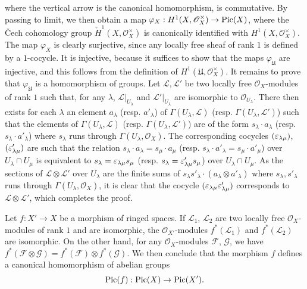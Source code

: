 where the vertical arrow is the canonical homomorphism, is commutative. By passing to limit, we then obtain a map $\varphi_X:H^1(X,\mathscr{O}_X^{\times})\to\mathrm{Pic}(X)$, where the \v{C}ech cohomology group $\check{H}^1(X,\mathscr{O}_{X}^{\times})$ is canonically identified with $H^1(X,\mathscr{O}_X^{\times})$. The map $\varphi_X$ is clearly surjective, since any locally free sheaf of rank $1$ is defined by a $1$-cocycle. It is injective, because it suffices to show that the maps $\varphi_{\mathfrak{U}}$ are injective, and this follows from the definition of $H^1(\mathfrak{U},\mathscr{O}_X^{\times})$. It remains to prove that $\varphi_{\mathfrak{U}}$ is a homomorphism of groups. Let $\mathscr{L},\mathscr{L}'$ be two locally free $\mathscr{O}_X$-modules of rank $1$ such that, for any $\lambda$, $\mathscr{L}|_{U_\lambda}$ and $\mathscr{L}'|_{U_\lambda}$ are isomorphic to $\mathscr{O}_{U_\lambda}$. There then exists for each $\lambda$ an element $a_\lambda$ (resp. $a'_\lambda$) of $\Gamma(U_\lambda,\mathscr{L})$ (resp. $\Gamma(U_\lambda,\mathscr{L}')$) such that the elements of $\Gamma(U_\lambda,\mathscr{L})$ (resp. $\Gamma(U_\lambda,\mathscr{L}')$) are of the form $s_\lambda\cdot a_\lambda$ (resp. $s_\lambda\cdot a'_\lambda$) where $s_\lambda$ runs through $\Gamma(U_\lambda,\mathscr{O}_X)$. The corresponding cocycles $(\varepsilon_{\lambda\mu})$, $(\varepsilon_{\lambda\mu}')$ are such that the relation $s_\lambda\cdot a_\lambda=s_\mu\cdot a_\mu$ (resp. $s_\lambda\cdot a'_\lambda=s_\mu\cdot a'_\mu$) over $U_\lambda\cap U_\mu$ is equivalent to $s_\lambda=\varepsilon_{\lambda\mu}s_\mu$ (resp. $s_\lambda=\varepsilon'_{\lambda\mu}s_\mu$) over $U_\lambda\cap U_\mu$. As the sections of $\mathscr{L}\otimes\mathscr{L}'$ over $U_\lambda$ are the finite sums of $s_\lambda s'_\lambda\cdot(a_\lambda\otimes a'_\lambda)$ where $s_\lambda,s'_\lambda$ runs through $\Gamma(U_\lambda,\mathscr{O}_X)$, it is clear that the cocycle $(\varepsilon_{\lambda\mu}\varepsilon'_{\lambda\mu})$ corresponds to $\mathscr{L}\otimes\mathscr{L}'$, which completes the proof.\par
Let $f:X'\to X$ be a morphism of ringed spaces. If $\mathscr{L}_1$, $\mathscr{L}_2$ are two locally free $\mathscr{O}_X$-modules of rank $1$ and are isomorphic, the $\mathscr{O}_{X'}$-modules $f^*(\mathscr{L}_1)$ and $f^*(\mathscr{L}_2)$ are isomorphic. On the other hand, for any $\mathscr{O}_X$-modules $\mathscr{F}$, $\mathscr{G}$, we have $f^*(\mathscr{F}\otimes\mathscr{G})=f^*(\mathscr{F})\otimes f^*(\mathscr{G})$. We then conclude that the morphism $f$ defines a canonical homomorphism of abelian groups
\[\mathrm{Pic}(f):\mathrm{Pic}(X)\to\mathrm{Pic}(X').\]
